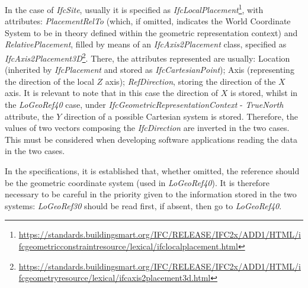 In the case of \textit{IfcSite}, usually it is specified as \textit{IfcLocalPlacement}\footnote{\url{https://standards.buildingsmart.org/IFC/RELEASE/IFC2x/ADD1/HTML/ifcgeometricconstraintresource/lexical/ifclocalplacement.html}}, with attributes: \textit{PlacementRelTo} (which, if omitted, indicates the World Coordinate System to be in theory defined within the geometric representation context) and \textit{RelativePlacement}, filled by means of an \textit{IfcAxis2Placement} class, specified as \textit{IfcAxis2Placement3D}\footnote{\url{https://standards.buildingsmart.org/IFC/RELEASE/IFC2x/ADD1/HTML/ifcgeometryresource/lexical/ifcaxis2placement3d.html}}.
There, the attributes represented are usually: Location (inherited by \textit{IfcPlacement} and stored as \textit{IfcCartesianPoint}); Axis (representing the direction of the local $Z$ axis); \textit{RefDirection}, storing the direction of the $X$ axis.
It is relevant to note that in this case the direction of $X$ is stored, whilst in the \textit{LoGeoRef40} case, under \textit{IfcGeometricRepresentationContext} - \textit{TrueNorth} attribute, the $Y$ direction of a possible Cartesian system is stored.
Therefore, the values of two vectors composing the \textit{IfcDirection} are inverted in the two cases.
This must be considered when developing software applications reading the data in the two cases.

In the specifications, it is established that, whether omitted, the reference should be the geometric coordinate system (used in \textit{LoGeoRef40}).
It is therefore necessary to be careful in the priority given to the information stored in the two systems: \textit{LoGeoRef30} should be read first, if absent, then go to \textit{LoGeoRef40}.








